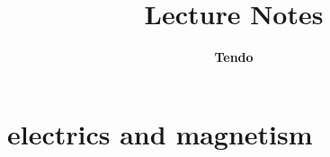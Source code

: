 \documentclass[12pt]{report}
\title{\textrm{Lecture Notes}}
\author{\Large\textbf{\textrm{Tendo}} \\ \large\university{shanghai jiao tong university}}
\date{\submissiondate{September 11, 2025}}
\begin{document}

\newpage 
\toc
\thispagestyle{empty}
\newpage 

\part[Electrics and Magnetism]{electrics and magnetism}

\fancypage

\end{document}
